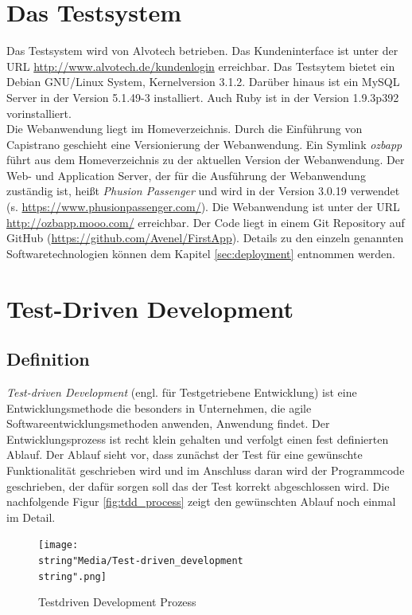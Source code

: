 \documentclass[12pt,             %
               a4paper,          %
               listof=totoc,     %
               index=totoc,      %
               bibliography=totoc,%
               oneside,         %
               BCOR1cm,          %
               english   %
               ]{scrbook}
\begin{document}
\section{Das Testsystem}\label{sec:Das_Testsystem}
Das Testsystem wird von Alvotech betrieben. Das Kundeninterface ist unter der URL \url{http://www.alvotech.de/kundenlogin} erreichbar. Das Testsytem bietet ein Debian GNU/Linux System, Kernelversion 3.1.2. Darüber hinaus ist ein MySQL Server in der Version 5.1.49-3 installiert. Auch Ruby ist in der Version 1.9.3p392 vorinstalliert.\\
Die Webanwendung liegt im Homeverzeichnis. Durch die Einführung von Capistrano geschieht eine Versionierung der Webanwendung. Ein Symlink \textit{ozbapp} führt aus dem Homeverzeichnis zu der aktuellen Version der Webanwendung. Der Web- und Application Server, der für die Ausführung der Webanwendung zuständig ist, heißt \textit{Phusion Passenger} und wird in der Version 3.0.19 verwendet (s. \url{https://www.phusionpassenger.com/}). Die Webanwendung ist unter der URL \url{http://ozbapp.mooo.com/} erreichbar. Der Code liegt in einem Git Repository auf GitHub (\url{https://github.com/Avenel/FirstApp}). Details zu den einzeln genannten Softwaretechnologien können dem Kapitel \ref{sec:deployment} entnommen werden.


\section{Test-Driven Development}
\subsection{Definition}
\textit{Test-driven Development} (engl. für \glqq Testgetriebene Entwicklung\grqq) ist eine Entwicklungsmethode die besonders in Unternehmen, die agile Softwareentwicklungsmethoden anwenden, Anwendung findet. Der Entwicklungsprozess ist recht klein gehalten und verfolgt einen fest definierten Ablauf. Der Ablauf sieht vor, dass zunächst der Test für eine gewünschte Funktionalität geschrieben wird und im Anschluss daran wird der Programmcode geschrieben, der dafür sorgen soll das der Test korrekt abgeschlossen wird. Die nachfolgende Figur \vref{fig:tdd_process} zeigt den gewünschten Ablauf noch einmal im Detail.

\begin{figure}[H]
     \begin{center}
          \texttt{[image: \\string"Media/Test-driven\_development\\string".png]}
     \end{center}
     \label{fig:tdd_process}
     \caption{Testdriven Development Prozess}
\end{figure} 
\end{document}
